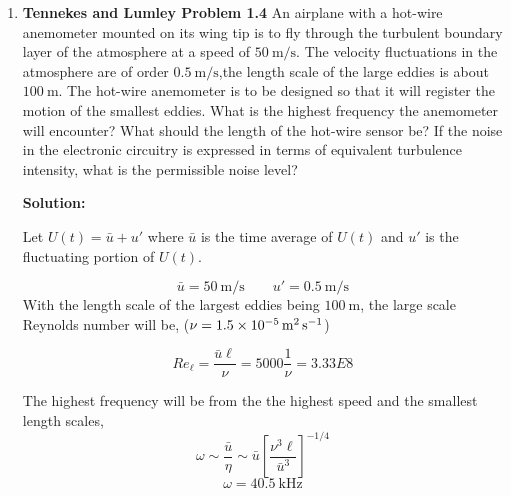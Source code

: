 \documentclass[12tpt]{article}
\newenvironment{Solution}
    {\textbf{Solution:}
    
    \vspace{5mm}
    \begin{tcolorbox}
    }
    {
    \end{tcolorbox}
    \vspace{5mm}
    }
\begin{document}

\begin{enumerate}



\item \textbf{Tennekes and Lumley Problem 1.4} An airplane with a hot-wire anemometer mounted on its wing tip is to fly through the turbulent boundary layer of the atmosphere at a speed of $\SI{50}{\meter\per\second}$. The velocity fluctuations in the atmosphere are of order $\SI{0.5}{\meter\per\second}$,the length scale of the large eddies is about $\SI{100}{\meter}$. The hot-wire anemometer is to be designed so that it will register the motion of the smallest eddies. What is the highest frequency the anemometer will encounter? What should the length of the hot-wire sensor be? If the noise in the electronic circuitry is
expressed in terms of equivalent turbulence intensity, what is the permissible noise level?

\begin{Solution}
Let $U(t) = \bar{u} + u'$ where $\bar{u}$ is the time average of $U(t)$ and $u'$ is the fluctuating portion of $U(t)$. 

\begin{equation}
    \bar{u} = \SI{50}{\meter\per\second} \qquad u'= \SI{0.5}{\meter\per\second}
\end{equation}
With the length scale of the largest eddies being $\SI{100}{\meter}$, the large scale Reynolds number will be, ($\nu = \SI{1.5E-5}{\meter\squared\per\second}$)

\begin{equation}
    Re_\ell = \frac{\bar{u} \ell}{\nu} = 5000 \frac{1}{\nu} = 3.33E8
\end{equation}

The highest frequency will be from the the highest speed and the smallest length scales, 
\begin{equation}
    \omega \sim \frac{\bar{u}}{\eta} \sim \bar{u}\left[\frac{\nu^3\ell}{\bar{u}^3}\right]^{-1/4}
\end{equation}
\begin{equation}
    \boxed{\omega = \SI{40.5}{\kilo\hertz}}
\end{equation}



\end{Solution}
\end{enumerate}
\end{document}
